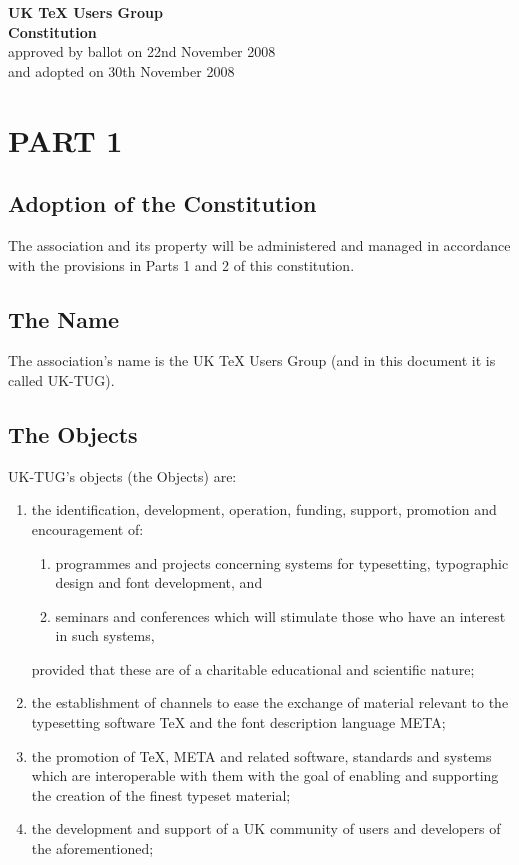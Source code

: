 \documentclass[a4paper,11pt]{article}
\newcommand{\MF}{{\manual META}\-{\manual FONT}}
\begin{document}
\begin{center}
\textbf{\Large{UK \TeX{} Users Group}} \\[3ex]
\textbf{Constitution} \\[2ex]
approved by ballot on 22nd November 2008 \\
and adopted on 30th November 2008
\end{center}
 
\vspace{2ex}
\section*{PART 1}

\subsection{Adoption of the Constitution}

The association and its property will be administered and managed in accordance
with the provisions in Parts 1 and 2 of this constitution.

\subsection{The Name}

The association's name is the UK \TeX{} Users Group (and in this document it
is called UK-TUG).

\subsection{The Objects}

UK-TUG's objects (the Objects) are:
\begin{enumerate}
\item the identification, development, operation, funding, support, promotion
  and encouragement of:
  \begin{enumerate}
  \item programmes and projects concerning systems for typesetting, typographic
   design and font development, and
  \item seminars and conferences which will stimulate those who have an 
   interest in such systems,
  \end{enumerate}
  provided that these are of a charitable educational and scientific nature;
\item the establishment of channels to ease the exchange of material relevant to
  the typesetting software \TeX{} and the font description language \MF{};
\item the promotion of \TeX{}, \MF{} and related software, standards and systems
  which are interoperable with them with the goal of enabling and supporting the
  creation of the finest typeset material;
\item the development and support of a UK community of users and developers of
  the aforementioned;
\end{enumerate}
\end{document}

